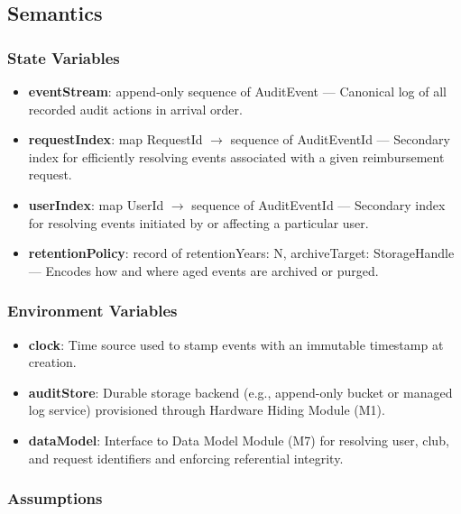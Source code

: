 \documentclass[12pt, titlepage]{article}
\begin{document}
\subsection{Semantics}

\subsubsection{State Variables}

\begin{itemize}
  \item \textbf{eventStream}: append-only sequence of AuditEvent --- Canonical log of all recorded audit actions in arrival order.
  \item \textbf{requestIndex}: map RequestId $\rightarrow$ sequence of AuditEventId --- Secondary index for efficiently resolving events associated with a given reimbursement request.
  \item \textbf{userIndex}: map UserId $\rightarrow$ sequence of AuditEventId --- Secondary index for resolving events initiated by or affecting a particular user.
  \item \textbf{retentionPolicy}: record of retentionYears: N, archiveTarget: StorageHandle --- Encodes how and where aged events are archived or purged.
\end{itemize}

\subsubsection{Environment Variables}

\begin{itemize}
  \item \textbf{clock}: Time source used to stamp events with an immutable timestamp at creation.
  \item \textbf{auditStore}: Durable storage backend (e.g., append-only bucket or managed log service) provisioned through Hardware Hiding Module (M1).
  \item \textbf{dataModel}: Interface to Data Model Module (M7) for resolving user, club, and request identifiers and enforcing referential integrity.
\end{itemize}

\subsubsection{Assumptions}
\end{document}
